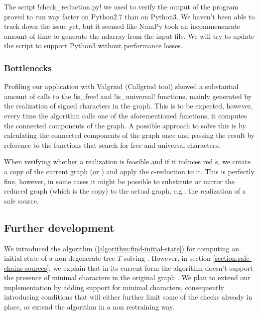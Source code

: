 The script !check_reduction.py! we used to verify the output of the \cc{} program proved to run way faster on Python2.7 than on Python3.
We haven't been able to track down the issue yet, but it seemed like NumPy took an incommensurate amount of time to generate the ndarray from the input file.
We will try to update the script to support Python3 without performance losses.

\subsubsection{Bottlenecks}\label{section:bottlenecks}

Profiling our application with Valgrind (Callgrind tool) showed a substantial amount of calls to the !is_free! and !is_universal! functions, mainly generated by the realization of signed characters in the graph.
This is to be expected, however, every time the algorithm calls one of the aforementioned functions, it computes the connected components of the graph.
A possible approach to solve this is by calculating the connected components of the graph once and passing the result by reference to the functions that search for free and universal characters.

When verifying whether a realization is feasible and if it induces red \sg{}s, we create a copy of the current graph \grb{} (or \gm{}) and apply the c-reduction to it.
This is perfectly fine, however, in some cases it might be possible to substitute or mirror the reduced graph (which is the copy) to the actual graph, e.g., the realization of a safe source.

\subsection{Further development}\label{section:further-dev}

We introduced the algorithm (\ref{algorithm:find-initial-state}) for computing an initial state of a non degenerate tree $T$ solving \grb{}.
However, in section \ref{section:safe-chains-sources}, we explain that in its current form the algorithm doesn't support the presence of minimal characters in the original graph \grb{}.
We plan to extend our implementation by adding support for minimal characters, consequently introducing conditions that will either further limit some of the checks already in place, or extend the algorithm in a non restraining way.

